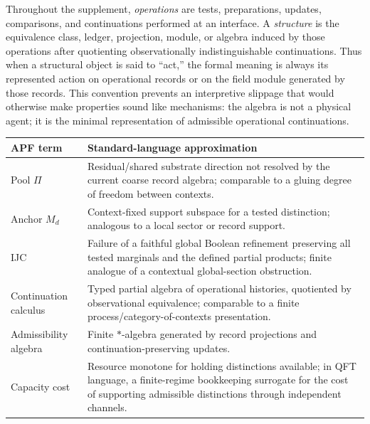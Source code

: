 \documentclass[11pt]{article}
\theoremstyle{definition}
\begin{document}
\begin{tcolorbox}[apfbox, title={Operational/structural convention}]
\footnotesize
Throughout the supplement, \emph{operations} are tests, preparations,
updates, comparisons, and continuations performed at an interface.  A
\emph{structure} is the equivalence class, ledger, projection, module, or
algebra induced by those operations after quotienting observationally
indistinguishable continuations.  Thus when a structural object is said to
``act,'' the formal meaning is always its represented action on operational
records or on the field module generated by those records.  This convention
prevents an interpretive slippage that would otherwise make properties
sound like mechanisms: the algebra is not a physical agent; it is the
minimal representation of admissible operational continuations.
\end{tcolorbox}
\begin{tcolorbox}[apfbox, title={Translation table for nonstandard vocabulary}]
\footnotesize
\begin{center}
\renewcommand{\arraystretch}{1.08}
\begin{tabular}{@{}p{3.2cm}p{9.0cm}@{}}
\toprule
\textbf{APF term} & \textbf{Standard-language approximation} \\
\midrule
Pool $\Pi$ & Residual/shared substrate direction not resolved by the current coarse record algebra; comparable to a gluing degree of freedom between contexts. \\
Anchor $M_d$ & Context-fixed support subspace for a tested distinction; analogous to a local sector or record support. \\
IJC & Failure of a faithful global Boolean refinement preserving all tested marginals and the defined partial products; finite analogue of a contextual global-section obstruction. \\
Continuation calculus & Typed partial algebra of operational histories, quotiented by observational equivalence; comparable to a finite process/category-of-contexts presentation. \\
Admissibility algebra & Finite $*$-algebra generated by record projections and continuation-preserving updates. \\
Capacity cost & Resource monotone for holding distinctions available; in QFT language, a finite-regime bookkeeping surrogate for the cost of supporting admissible distinctions through independent channels. \\
\bottomrule
\end{tabular}
\end{center}
\end{tcolorbox}
\end{document}
